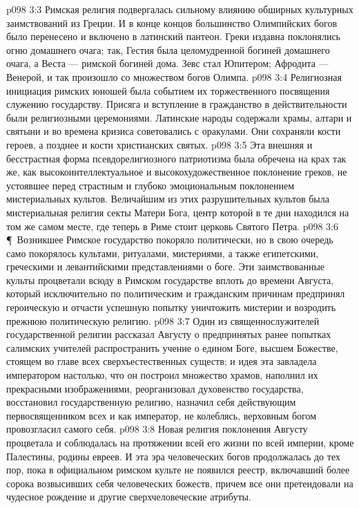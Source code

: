 \vs p098 3:3 Римская религия подвергалась сильному влиянию обширных культурных заимствований из Греции. И в конце концов большинство Олимпийских богов было перенесено и включено в латинский пантеон. Греки издавна поклонялись огню домашнего очага; так, Гестия была целомудренной богиней домашнего очага, а Веста --- римской богиней дома. Зевс стал Юпитером; Афродита --- Венерой, и так произошло со множеством богов Олимпа.
\vs p098 3:4 Религиозная инициация римских юношей была событием их торжественного посвящения служению государству. Присяга и вступление в гражданство в действительности были религиозными церемониями. Латинские народы содержали храмы, алтари и святыни и во времена кризиса советовались с оракулами. Они сохраняли кости героев, а позднее и кости христианских святых.
\vs p098 3:5 Эта внешняя и бесстрастная форма псевдорелигиозного патриотизма была обречена на крах так же, как высокоинтеллектуальное и высокохудожественное поклонение греков, не устоявшее перед страстным и глубоко эмоциональным поклонением мистериальных культов. Величайшим из этих разрушительных культов была мистериальная религия секты Матери Бога, центр которой в те дни находился на том же самом месте, где теперь в Риме стоит церковь Святого Петра.
\vs p098 3:6 \P\ Возникшее Римское государство покоряло политически, но в свою очередь само покорялось культами, ритуалами, мистериями, а также египетскими, греческими и левантийскими представлениями о боге. Эти заимствованные культы процветали всюду в Римском государстве вплоть до времени Августа, который исключительно по политическим и гражданским причинам предпринял героическую и отчасти успешную попытку уничтожить мистерии и возродить прежнюю политическую религию.
\vs p098 3:7 Один из священнослужителей государственной религии рассказал Августу о предпринятых ранее попытках салимских учителей распространить учение о едином Боге, высшем Божестве, стоящем во главе всех сверхъестественных существ; и идея эта завладела императором настолько, что он построил множество храмов, наполнил их прекрасными изображениями, реорганизовал духовенство государства, восстановил государственную религию, назначил себя действующим первосвященником всех и как император, не колеблясь, верховным богом провозгласил самого себя.
\vs p098 3:8 Новая религия поклонения Августу процветала и соблюдалась на протяжении всей его жизни по всей империи, кроме Палестины, родины евреев. И эта эра человеческих богов продолжалась до тех пор, пока в официальном римском культе не появился реестр, включавший более сорока возвысивших себя человеческих божеств, причем все они претендовали на чудесное рождение и другие сверхчеловеческие атрибуты.
